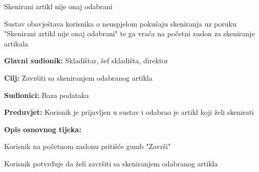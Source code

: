 \begin{packed_item}
\begin{packed_item}
							\item[2.b] Skenirani artikl nije onaj odabrani
							\item[] \begin{packed_enum}
								\item Sustav obavještava korisnika o neuspjelom pokušaju skeniranja uz poruku "Skenirani artikl nije onaj odabrani" te ga vraća na početni zaslon za skeniranje artikala\\  
							\end{packed_enum}
						\end{packed_item}
					\end{packed_item}
				
					\noindent {}
					\begin{packed_item}
						\item \textbf{Glavni sudionik: }Skladištar, šef skladišta, direktor
						\item  \textbf{Cilj:} Završiti sa skeniranjem odabranog artikla
						\item  \textbf{Sudionici:} Baza podataka
						\item  \textbf{Preduvjet:} Korisnik je prijavljen u sustav i odabrao je artikl koji želi skenirati
						\item  \textbf{Opis osnovnog tijeka:}
						\item[] \begin{packed_enum}
							\item Korisnik na početnom zaslonu pritišće gumb "Završi"
							\item Korisnik potvrđuje da želi završiti sa skeniranjem odabranog artikla
						\end{packed_enum}
					\end{packed_item}
					
